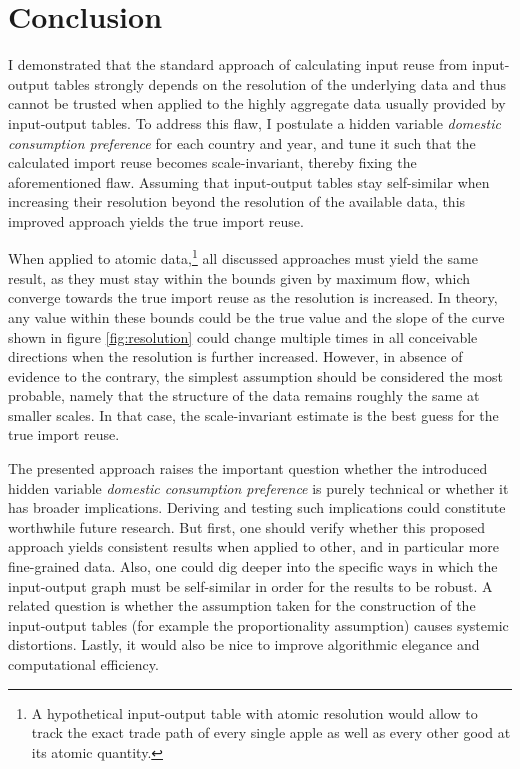 \documentclass[english]{uzhpub}
\begin{document}
\section{Conclusion}
\label{sec:conclusion}
I demonstrated that the standard approach of calculating input reuse from input-output tables strongly depends on the resolution of the underlying data and thus cannot be trusted when applied to the highly aggregate data usually provided by input-output tables. To address this flaw, I postulate a hidden variable \emph{domestic consumption preference} for each country and year, and tune it such that the calculated import reuse becomes scale-invariant, thereby fixing the aforementioned flaw. Assuming that input-output tables stay self-similar when increasing their resolution beyond the resolution of the available data, this improved approach yields the true import reuse.

When applied to atomic data,\footnote{A hypothetical input-output table with atomic resolution would allow to track the exact trade path of every single apple as well as every other good at its atomic quantity.} all discussed approaches must yield the same result, as they must stay within the bounds given by maximum flow, which converge towards the true import reuse as the resolution is increased. In theory, any value within these bounds could be the true value and the slope of the curve shown in figure \ref{fig:resolution} could change multiple times in all conceivable directions when the resolution is further increased. However, in absence of evidence to the contrary, the simplest assumption should be considered the most probable, namely that the structure of the data remains roughly the same at smaller scales. In that case, the scale-invariant estimate is the best guess for the true import reuse.

The presented approach raises the important question whether the introduced hidden variable \emph{domestic consumption preference} is purely technical or whether it has broader implications. Deriving and testing such implications could constitute worthwhile future research. But first, one should verify whether this proposed approach yields consistent results when applied to other, and in particular more fine-grained data. Also, one could dig deeper into the specific ways in which the input-output graph must be self-similar in order for the results to be robust. A related question is whether the assumption taken for the construction of the input-output tables (for example the proportionality assumption) causes systemic distortions. Lastly, it would also be nice to improve algorithmic elegance and computational efficiency.


\end{document}
